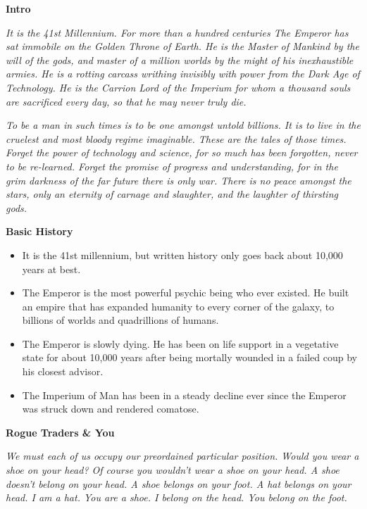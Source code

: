 \documentclass[10pt,a4paper]{article}
\newcommand{\rpgsection}[1]{%
  \vspace{0.8em}%
  {\headerfont\bfseries\Large #1}\par%
  \vspace{0.5em}%
}
\begin{document}
\vspace{0.5cm} %

\begin{multicols}{2}

\rpgsection{Intro}
\textit{It is the 41st Millennium. For more than a hundred centuries The Emperor has sat immobile on the Golden Throne of Earth. He is the Master of Mankind by the will of the gods, and master of a million worlds by the might of his inexhaustible armies. He is a rotting carcass writhing invisibly with power from the Dark Age of Technology. He is the Carrion Lord of the Imperium for whom a thousand souls are sacrificed every day, so that he may never truly die.}

\textit{To be a man in such times is to be one amongst untold billions. It is to live in the cruelest and most bloody regime imaginable. These are the tales of those times. Forget the power of technology and science, for so much has been forgotten, never to be re-learned. Forget the promise of progress and understanding, for in the grim darkness of the far future there is only war. There is no peace amongst the stars, only an eternity of carnage and slaughter, and the laughter of thirsting gods.}

\rpgsection{Basic History}
\begin{itemize}
  \item It is the 41st millennium, but written history only goes back about 10,000 years at best.
  \item The Emperor is the most powerful psychic being who ever existed. He built an empire that has expanded humanity to every corner of the galaxy, to billions of worlds and quadrillions of humans.
  \item The Emperor is slowly dying. He has been on life support in a vegetative state for about 10,000 years after being mortally wounded in a failed coup by his closest advisor.
  \item The Imperium of Man has been in a steady decline ever since the Emperor was struck down and rendered comatose.
\end{itemize}

\rpgsection{Rogue Traders \& You}
\textit{We must each of us occupy our preordained particular position. Would you wear a shoe on your head? Of course you wouldn't wear a shoe on your head. A shoe doesn't belong on your head. A shoe belongs on your foot. A hat belongs on your head. I am a hat. You are a shoe. I belong on the head. You belong on the foot.}


\end{multicols}
\end{document}
